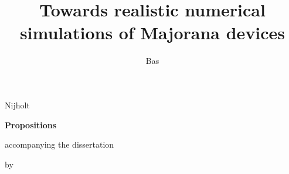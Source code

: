 \documentclass{dissertation}
\begin{document}
\title{Towards realistic numerical simulations of Majorana devices}  %
\author{Bas}{Nijholt}

\begin{center}

{\Large\titlefont\bfseries Propositions}

\smallskip

accompanying the dissertation

\smallskip

{\makeatletter
\titlestyle\bfseries\large\@title
\makeatother}

{\makeatletter
\ifx\@subtitle\undefined\else
    \titlefont\titleshape\@subtitle
\fi
\makeatother}

\smallskip

by

\smallskip

\makeatletter
{\large\titlefont\bfseries\@firstname\ {\titleshape\@lastname}}
\makeatother

\end{center}
\end{document}
